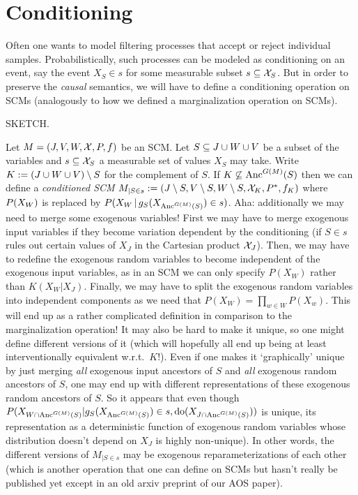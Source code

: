 \section{Conditioning}


Often one wants to model filtering processes that accept or reject individual samples.
Probabilistically, such processes can be modeled as conditioning on an event, say the
event $X_S \in s$ for some measurable subset $s \subseteq \mathcal{X}_S$.
But in order to preserve the \emph{causal} semantics, we will have to define a conditioning
operation on SCMs (analogously to how we defined a marginalization operation on SCMs).

\begin{Def}\label{def:conditioned_scm}
  SKETCH.

  Let $M = \left ( J, V, W, \mathcal{X}, P, f \right )$ be an SCM.
  Let $S \subseteq J \cup W \cup V$ be a subset of the variables and $s \subseteq \mathcal{X}_S$ a measurable set of values $X_S$ may take.
  Write $K := (J \cup W \cup V) \setminus S$ for the complement of $S$.
  If $K \not\subseteq \mathrm{Anc}^{G(M)}(S)$ then we can define a \emph{conditioned SCM}
  $M_{|S\in s} := \left ( J \setminus S, V \setminus S, W \setminus S, \mathcal{X}_K, P^*, f_K \right )$
  where $P(X_{W})$ is replaced by $P(X_{W} \operatorname*{|} g_S(X_{\mathrm{Anc}^{G(M)}(S)}) \in s)$.
  Aha: additionally we may need to merge some exogenous variables!
  First we may have to merge exogenous input variables if they become variation dependent by the conditioning (if $S \in s$ rules out certain values of $X_J$ in the Cartesian product $\mathcal{X}_J$).
  Then, we may have to redefine the exogenous random variables to become independent of the exogenous input variables, as in an SCM we can only specify $P(X_W)$ rather than $K(X_W | X_J)$.
  Finally, we may have to split the exogenous random variables into independent components as we need that $P(X_W) = \prod_{w \in W} P(X_w)$.
  This will end up as a rather complicated definition in comparison to the marginalization operation!
  It may also be hard to make it unique, so one might define different versions of it (which will hopefully all end up being at least interventionally equivalent w.r.t.\ $K$!).
  Even if one makes it `graphically' unique by just merging \emph{all} exogenous input ancestors of $S$ and \emph{all} exogenous random ancestors of $S$, one may end up with different representations of these exogenous random ancestors of $S$.
  So it appears that even though
  $P(X_{W \cap \mathrm{Anc}^{G(M)}(S)} | g_S(X_{\mathrm{Anc}^{G(M)}(S)}) \in s, \operatorname{do}(X_{J \cap \mathrm{Anc}^{G(M)}(S)}))$ is unique, its representation as a deterministic function of exogenous random variables whose
  distribution doesn't depend on $X_J$ is highly non-unique).
  In other words, the different versions of $M_{|S\in s}$ may be exogenous reparameterizations of each other (which is another operation that one can define on SCMs but hasn't really be published yet except in an old arxiv preprint of our AOS paper).
\end{Def}

